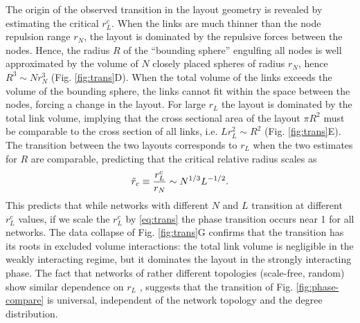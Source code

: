 \documentclass[linenumbers,endfloats,nofootinbib,preprint,floatfix,titlepage,superscriptaddress]{revtex4-1} %
\begin{document}
The origin of the observed transition in the layout geometry is revealed by estimating the critical $r_L^c$.
When the links are much thinner than the node repulsion range  $r_N$, the layout is dominated by the repulsive forces between the nodes. 
Hence, the radius $R$ of the ``bounding sphere'' engulfing all nodes is well approximated by the volume of $N$ closely placed spheres of radius $r_N$, hence $ R^3 \sim Nr_N^3 $ (Fig. \ref{fig:trans}D). 
When the total volume of the links exceeds the volume of the bounding sphere, the links cannot fit within the space between the nodes, forcing a change in the layout.  
For large $r_L$ the layout is dominated by the total link volume, implying that the cross sectional area of the layout $\pi R^2$ must be comparable to the cross section of all links, i.e. $ L r_L^2 \sim R^2$ (Fig. \ref{fig:trans}E). 
The transition between the two layouts corresponds to   $r_L$ when the two estimates for $R$ are comparable, predicting that the critical relative radius  scales as
\begin{equation}
    \tilde{r}_c \equiv {r^c_L\over r_N} \sim N^{1/3} L^{-1/2}. \label{eq:trans}
\end{equation}
This predicts that while networks with different $N$ and $L$ transition at different $r_L^c$ values, if we scale the $r_L^c$ by \eqref{eq:trans} the phase transition occurs near 1 for all networks.
The data collapse of Fig. \ref{fig:trans}G confirms that the transition has its roots in excluded volume interactions: the total link volume is negligible in the weakly interacting regime, but it dominates the layout in the strongly interacting phase.
The fact that networks of rather different topologies (scale-free, random) show similar dependence on $r_L$%
, suggests that the transition of Fig. \ref{fig:phase-compare} is universal, independent of the network topology and the degree distribution. 
\end{document}
